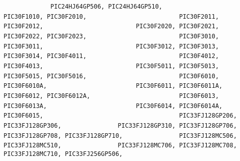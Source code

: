 {{{{\lstinline!             PIC24HJ64GP506, PIC24HJ64GP510,    ! \newline
\newline
\lstinline!             PIC30F1010, PIC30F2010,            ! \newline
\lstinline!             PIC30F2011, PIC30F2012,            ! \newline
\lstinline!             PIC30F2020, PIC30F2021,            ! \newline
\lstinline!             PIC30F2022, PIC30F2023,            ! \newline
\lstinline!             PIC30F3010, PIC30F3011,            ! \newline
\lstinline!             PIC30F3012, PIC30F3013,            ! \newline
\lstinline!             PIC30F3014, PIC30F4011,            ! \newline
\lstinline!             PIC30F4012, PIC30F4013,            ! \newline
\lstinline!             PIC30F5011, PIC30F5013,            ! \newline
\lstinline!             PIC30F5015, PIC30F5016,            ! \newline
\lstinline!             PIC30F6010, PIC30F6010A,           ! \newline
\lstinline!             PIC30F6011, PIC30F6011A,           ! \newline
\lstinline!             PIC30F6012, PIC30F6012A,           ! \newline
\lstinline!             PIC30F6013, PIC30F6013A,           ! \newline
\lstinline!             PIC30F6014, PIC30F6014A,           ! \newline
\lstinline!             PIC30F6015,                        ! \newline
\newline
\lstinline!             PIC33FJ128GP206, PIC33FJ128GP306,  ! \newline
\lstinline!             PIC33FJ128GP310, PIC33FJ128GP706,  ! \newline
\lstinline!             PIC33FJ128GP708, PIC33FJ128GP710,  ! \newline
\lstinline!             PIC33FJ128MC506, PIC33FJ128MC510,  ! \newline
\lstinline!             PIC33FJ128MC706, PIC33FJ128MC708,  ! \newline
\lstinline!             PIC33FJ128MC710, PIC33FJ256GP506,  ! \newline
}}}}
